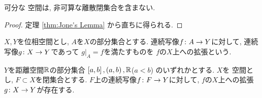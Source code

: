 \documentclass[uplatex, dvipdfmx, a4paper, 12pt, class=jsbook, crop=false]{standalone}
\begin{document}
\begin{corollary}
	\label{coro:Corollary of Jone's Lamma}
	可分な  空間は, 非可算な離散閉集合を含まない.
\end{corollary}

\begin{proof}
	定理 \ref{thm:Jone's Lemma} から直ちに得られる.
\end{proof}

\begin{definition}
	\( X, Y \)を位相空間とし, \( A \)を\( X \)の部分集合とする.
	連続写像\( f\colon A\to Y \)に対して,
	連続写像\( g\colon X\to Y \)であって
	\( g|_A = f \)を満たすものを
	\( f \)の\( X \)上への拡張という.
\end{definition}

\begin{theorem}
	\label{t400004}
	\( Y \)を距離空間\( \mathbb{R} \)の部分集合
	\( \left[ a , b \right], \left( a , b \right), \mathbb{R} \)(\( a < b \))
	のいずれかとする.
	\( X \)を  空間とし, \( F \subset X \)を閉集合とする.
	\( F \)上の連続写像\( f\colon F\to Y \)に対して,
	\( f \)の\( X \)上への拡張\( g\colon X\to Y \)が存在する.
\end{theorem}
\end{document}
